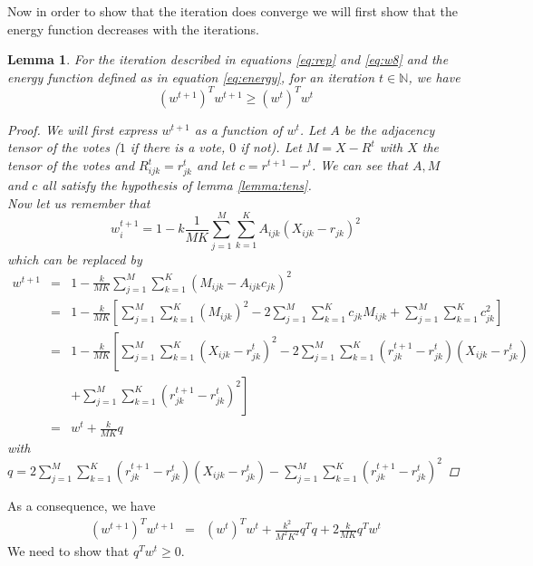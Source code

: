 \documentclass[12pt,a4paper]{article}
\newtheorem{lemma}{Lemma}
\begin{document}
Now in order to show that the iteration does converge we will first show that the energy function decreases with the iterations.
\begin{lemma}
For the iteration described in equations \ref{eq:rep} and \ref{eq:w8} and the energy function defined as in equation \ref{eq:energy}, for an iteration $t\in \mathbb{N}$, we have 
$$(w^{t+1})^Tw^{t+1} \geq (w^t)^Tw^t$$
\begin{proof}
We will first express $w^{t+1}$ as a function of $w^t$.
Let $A$ be the adjacency tensor of the votes ($1$ if there is a vote, $0$ if not). Let $M = X - R^t$ with $X$ the tensor of the votes and $R^t_{ijk} = r^t_{jk}$ and let $c = r^{t+1}-r^{t}$. We can see that $A,M$ and $c$ all satisfy the hypothesis of lemma \ref{lemma:tens}.\\
Now let us remember that 
$$w_i^{t+1} = 1 - k \frac{1}{MK} \sum_{j=1}^M \sum_{k=1}^K A_{ijk}(X_{ijk}-r_{jk})^2$$
which can be replaced by
\begin{eqnarray*}
w^{t+1} & = & 1 - \frac{k}{MK} \sum_{j=1}^M \sum_{k=1}^K  (M_{ijk} - A_{ijk}c_{jk})^2\\
& = & 1- \frac{k}{MK}\left[ \sum_{j=1}^M \sum_{k=1}^K (M_{ijk})^2 - 2 \sum_{j=1}^M \sum_{k=1}^K c_{jk}M_{ijk} + \sum_{j=1}^M \sum_{k=1}^K  c_{jk}^2 \right]\\
& = & 1 - \frac{k}{MK}\left[ \sum_{j=1}^M \sum_{k=1}^K (X_{ijk}-r_{jk}^t)^2  - 2 \sum_{j=1}^M \sum_{k=1}^K (r^{t+1}_{jk}-r^t_{jk})(X_{ijk}-r^t_{jk}) \right.\\
& & \left. + \sum_{j=1}^M \sum_{k=1}^K  (r^{t+1}_{jk} - r^t_{jk})^2 \right]\\
& = & w^t + \frac{k}{MK} q
\end{eqnarray*}
with $q = 2 \sum_{j=1}^M \sum_{k=1}^K (r^{t+1}_{jk}-r^t_{jk})(X_{ijk}-r^t_{jk}) - \sum_{j=1}^M \sum_{k=1}^K  (r^{t+1}_{jk} - r^t_{jk})^2 $
\end{proof}
\end{lemma}

As a consequence, we have
\begin{eqnarray*}
(w^{t+1})^Tw^{t+1} & = & (w^t)^Tw^t + \frac{k^2}{M^2K^2} q^Tq + 2 \frac{k}{MK} q^T w^t
\end{eqnarray*}
We need to show that $q^Tw^t \geq 0$.
\end{document}
